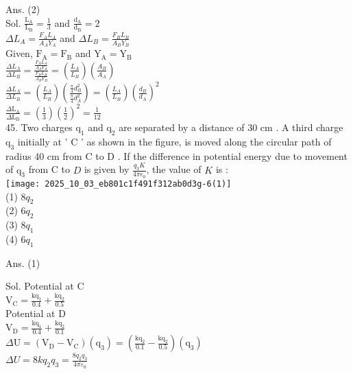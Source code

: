 \documentclass[10pt]{article}
\begin{document}
Ans. (2)\\
Sol. \(\frac{\mathrm{L}_{\mathrm{A}}}{\mathrm{L}_{\mathrm{B}}}=\frac{1}{3}\) and \(\frac{\mathrm{d}_{\mathrm{A}}}{\mathrm{d}_{\mathrm{B}}}=2\)\\
\(\Delta L_{A}=\frac{F_{A} L_{A}}{A_{A} Y_{A}}\) and \(\Delta L_{B}=\frac{F_{B} L_{B}}{A_{B} Y_{B}}\)\\
Given, \(\mathrm{F}_{\mathrm{A}}=\mathrm{F}_{\mathrm{B}}\) and \(\mathrm{Y}_{\mathrm{A}}=\mathrm{Y}_{\mathrm{B}}\)\\
\(\frac{\Delta L_{A}}{\Delta L_{B}}=\frac{\frac{F_{A} L_{A}}{A_{A} Y_{A}}}{\frac{F_{B} L_{B}}{A_{B} Y_{B}}}=\left(\frac{L_{A}}{L_{B}}\right)\left(\frac{A_{B}}{A_{A}}\right)\)\\
\(\frac{\Delta L_{A}}{\Delta L_{B}}=\left(\frac{L_{A}}{L_{B}}\right)\left(\frac{\frac{\pi}{4} d_{B}^{2}}{\frac{\pi}{4} d_{A}^{2}}\right)=\left(\frac{L_{A}}{L_{B}}\right)\left(\frac{d_{B}}{d_{A}}\right)^{2}\)\\
\(\frac{\Delta \mathrm{L}_{\mathrm{A}}}{\Delta \mathrm{L}_{\mathrm{B}}}=\left(\frac{1}{3}\right)\left(\frac{1}{2}\right)^{2}=\frac{1}{12}\)\\
45. Two charges \(\mathrm{q}_{1}\) and \(\mathrm{q}_{2}\) are separated by a distance of 30 cm . A third charge \(\mathrm{q}_{3}\) initially at ' C ' as shown in the figure, is moved along the circular path of radius 40 cm from C to D . If the difference in potential energy due to movement of \(\mathrm{q}_{3}\) from C to \(D\) is given by \(\frac{q_{3} K}{4 \pi \epsilon_{0}}\), the value of \(K\) is :\\
\texttt{[image: 2025\_10\_03\_eb801c1f491f312ab0d3g-6(1)]}\\
(1) \(8 q_{2}\)\\
(2) \(6 q_{2}\)\\
(3) \(8 q_{1}\)\\
(4) \(6 q_{1}\)

Ans. (1)

Sol. Potential at C\\
\(\mathrm{V}_{\mathrm{C}}=\frac{\mathrm{kq}_{1}}{0.4}+\frac{\mathrm{kq}_{2}}{0.5}\)\\
Potential at D\\
\(\mathrm{V}_{\mathrm{D}}=\frac{\mathrm{kq}_{1}}{0.4}+\frac{\mathrm{kq}_{2}}{0.1}\)\\
\(\Delta \mathrm{U}=\left(\mathrm{V}_{\mathrm{D}}-\mathrm{V}_{\mathrm{C}}\right)\left(\mathrm{q}_{3}\right)=\left(\frac{\mathrm{kq}_{2}}{0.1}-\frac{\mathrm{kq}_{2}}{0.5}\right)\left(\mathrm{q}_{3}\right)\)\\
\(\Delta U=8 k q_{2} q_{3}=\frac{8 q_{2} q_{3}}{4 \pi \varepsilon_{0}}\)
\end{document}
